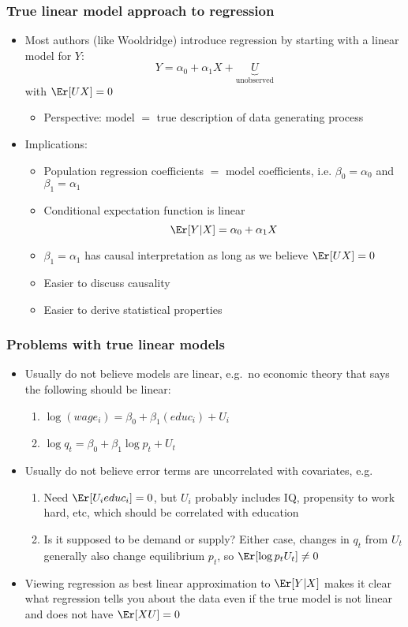\begin{frame}[allowframebreaks]
  \frametitle{True linear model approach to regression}
  \begin{itemize}
  \item Most authors (like Wooldridge) introduce regression by
    starting with a linear model for $Y$:
    \[ Y = \alpha_0 + \alpha_1 X + \underbrace{U}_{\text{unobserved}} \] 
    with $\Er[U X] = 0$
    \begin{itemize}
    \item Perspective: model $=$ true description of data generating
      process 
    \end{itemize}
  \item Implications:
    \begin{itemize}
    \item Population regression coefficients $=$ model coefficients,
      i.e. $\beta_0 = \alpha_0$ and $\beta_1 = \alpha_1$
    \item Conditional expectation function is linear 
      \[ \Er[Y|X] = \alpha_0 + \alpha_1 X \]
    \item $\beta_1=\alpha_1$ has causal interpretation as long as we
      believe $\Er[U X] = 0$
    \item Easier to discuss causality
    \item Easier to derive statistical properties
    \end{itemize}
  \end{itemize}
\end{frame}

\begin{frame}[allowframebreaks]
  \frametitle{Problems with true linear models}
  \begin{itemize}
  \item Usually do not believe models are linear, e.g.\ no economic
    theory that says the following should be linear:
    \begin{enumerate}
    \item $\log (wage_i) = \beta_0 + \beta_1 (educ_i) + U_i$
    \item $\log q_t = \beta_0 + \beta_1 \log p_t + U_t$
    \end{enumerate}
  \item Usually do not believe error terms are uncorrelated with
    covariates, e.g.\
    \begin{enumerate}
    \item Need $\Er[U_i educ_i]=0$, but $U_i$ probably includes IQ,
      propensity to work hard, etc, which should be correlated with
      education 
    \item Is it supposed to be demand or supply? Either case, changes
      in $q_t$ from $U_t$ generally also change equilibrium $p_t$, so
      $\Er[\log p_t U_t ] \neq 0$
    \end{enumerate}
  \item Viewing regression as best linear approximation to $\Er[Y|X]$
    makes it clear what regression tells you about the data even if
    the true model is not linear and does not have $\Er[XU]=0$
  \end{itemize}
\end{frame}


